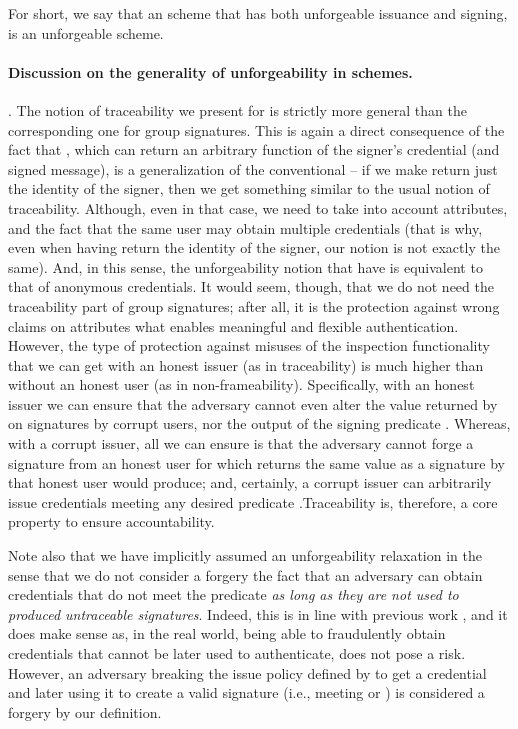 For short, we say that an \UAS scheme that has both unforgeable issuance and
signing, is an unforgeable \UAS scheme.

\paragraph{Discussion on the generality of unforgeability in \UAS schemes.} %
.
The notion of traceability we present for \UAS is strictly more general than
the corresponding one for group signatures. This is again a direct
consequence of the fact that \Inspect, which can return an arbitrary function
of the signer's credential (and signed message), is a generalization of the
conventional \Open -- if we make \Inspect return just the identity of the
signer, then we get something similar to the usual notion of traceability.
Although, even in that case, we need to take into account attributes, and the
fact that the same user may obtain multiple credentials (that is why, even when
having \Inspect return the identity of the signer, our notion is not exactly
the same). And, in this sense, the unforgeability notion that \UAS have is
equivalent to that of anonymous credentials. It would seem, though, that we do
not need the traceability part of group signatures; after all, it is the
protection against wrong claims on attributes what enables meaningful and
flexible authentication. However, the type of protection against misuses of
the inspection functionality that we can get with an honest issuer (as in
traceability) is much higher than without an honest user (as in
non-frameability). Specifically, with an honest issuer we can ensure that
the adversary cannot even alter the value returned by \Inspect on signatures
by corrupt users, nor the output of the signing predicate \feval. Whereas, with
a corrupt issuer, all we can ensure is that
the adversary cannot forge a signature from an honest user for which \Inspect
returns the same value as a signature by that honest user would produce; and,
certainly, a corrupt issuer can arbitrarily issue credentials meeting any
desired predicate \feval .Traceability is, therefore, a core property to ensure
accountability.

Note also that we have implicitly assumed an unforgeability relaxation in the
sense that we do not consider a forgery the fact that an adversary can obtain
credentials that do not meet the \fissue predicate \emph{as long as they are
  not used to produced untraceable signatures}. Indeed, this is in line with
previous work \cite[Section 3.3.3]{ckl+15}, and it does make sense as, in the
real world, being able to fraudulently obtain credentials that cannot be later
used to authenticate, does not pose a risk. However, an adversary breaking
the issue policy defined by \fissue to get a credential and later using it to
create a valid signature (i.e., meeting \feval or \finsp) is considered a
forgery by our definition.

